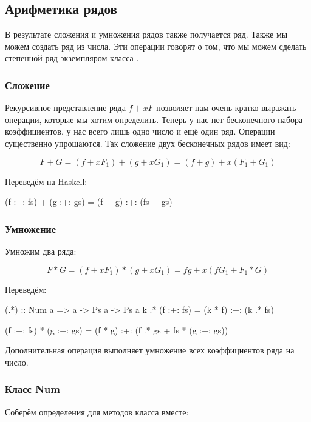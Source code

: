 \subsection{Арифметика рядов}

В результате сложения и умножения рядов также получается ряд. Также мы
можем создать ряд из числа. Эти операции говорят о том, что мы можем
сделать степенной ряд экземпляром класса .

\subsubsection{Сложение}

Рекурсивное представление ряда $f + x F$ позволяет нам очень кратко
выражать операции, которые мы хотим определить. Теперь у нас нет
бесконечного набора коэффициентов, у нас всего лишь одно число и ещё
один ряд. Операции существенно упрощаются. Так сложение двух бесконечных
рядов имеет вид:

\[F + G = (f + x F_1) + (g + x G_1) = (f+g) + x (F_1 + G_1)\]

Переведём на Haskell:


\begin{code}
(f :+: fs) + (g :+: gs) = (f + g) :+: (fs + gs)
\end{code}

\subsubsection{Умножение}

Умножим два ряда:

\[F*G = (f + x F_1) * (g + x G_1) = f g + x (f G_1 + F_1 * G)\]

Переведём:


\begin{code}
(.*) :: Num a => a -> Ps a -> Ps a
k .* (f :+: fs) = (k * f) :+: (k .* fs)  

(f :+: fs) * (g :+: gs) = (f * g) :+: (f .* gs + fs * (g :+: gs))
\end{code}

Дополнительная операция  выполняет умножение всех коэффициентов
ряда на число.

\subsubsection{Класс Num}

Соберём определения для методов класса  вместе:


